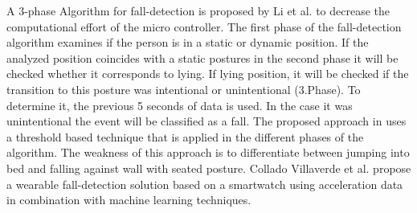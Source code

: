 \documentclass[review]{elsarticle}
\begin{document}
A 3-phase Algorithm for fall-detection is proposed by Li et al. to decrease the computational effort of the micro controller. The first phase of the fall-detection algorithm examines if the person is in a static or dynamic position. If the analyzed position coincides with a static postures in the second phase it will be checked whether it corresponds to lying. If lying position, it will be checked if the transition to this posture was intentional or unintentional (3.Phase). To determine it, the previous 5 seconds of data is used. In the case it was unintentional the event will be classified as a fall. The proposed approach in \cite{Li2009} uses a threshold based technique that is applied in the different phases of the algorithm. The weakness of this approach is to differentiate between jumping into bed and falling against wall with seated posture. Collado Villaverde et al. \cite{colladomachine} propose a wearable fall-detection solution based on a smartwatch using acceleration data in combination with machine learning techniques.
\end{document}
